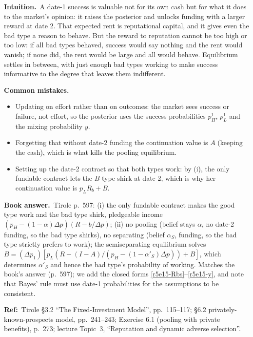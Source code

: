 \documentclass[11pt,a4paper]{article}
\newcommand{\intuition}{\par\medskip\noindent\textbf{Intuition.}~}
\newcommand{\bookans}{\par\medskip\noindent\textbf{Book answer.}~}
\newcommand{\refbib}{\par\smallskip\noindent\textbf{Ref:}~}
\newcommand{\pitfalls}{\par\medskip\noindent\textbf{Common mistakes.}}
\begin{document}
\intuition A date-1 success is valuable not for its own cash but for what it does to the market's opinion: it raises the posterior and unlocks funding with a larger reward at date 2. That expected rent is reputational capital, and it gives even the bad type a reason to behave. But the reward to reputation cannot be too high or too low: if all bad types behaved, success would say nothing and the rent would vanish; if none did, the rent would be large and all would behave. Equilibrium settles in between, with just enough bad types working to make success informative to the degree that leaves them indifferent.

\pitfalls
\begin{itemize}
  \item Updating on effort rather than on outcomes: the market sees success or failure, not effort, so the posterior uses the success probabilities $p^1_H$, $p^1_L$ and the mixing probability $y$.
  \item Forgetting that without date-2 funding the continuation value is $A$ (keeping the cash), which is what kills the pooling equilibrium.
  \item Setting up the date-2 contract so that both types work: by (i), the only fundable contract lets the $B$-type shirk at date 2, which is why her continuation value is $p_LR_b+B$.
\end{itemize}

\bookans Tirole p.~597: (i) the only fundable contract makes the good type work and the bad type shirk, pledgeable income $(p_H-(1-\alpha)\Delta p)(R-b/\Delta p)$; (ii) no pooling (belief stays $\alpha$, no date-2 funding, so the bad type shirks), no separating (belief $\alpha_S$, funding, so the bad type strictly prefers to work); the semiseparating equilibrium solves $B=(\Delta p_1)[p_L(R-(I-A)/(p_H-(1-\alpha'_S)\Delta p))+B]$, which determines $\alpha'_S$ and hence the bad type's probability of working. Matches the book's answer (p.~597); we add the closed forms \eqref{r5e15-Rbs}--\eqref{r5e15-y}, and note that Bayes' rule must use date-1 probabilities for the assumptions to be consistent.
\refbib{Tirole \S3.2 ``The Fixed-Investment Model'', pp.~115--117; \S6.2 privately-known-prospects model, pp.~241--243; Exercise 6.1 (pooling with private benefits), p.~273; lecture Topic~3, ``Reputation and dynamic adverse selection''.}
\end{document}
